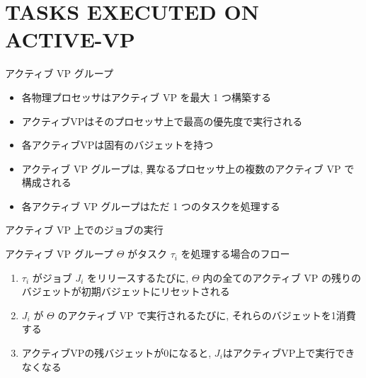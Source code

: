 
\section{TASKS EXECUTED ON ACTIVE-VP}
\label{sec: tasks executed on active-vp}

\begin{frame}{アクティブ VP グループ}
    \begin{definition}[アクティブVP]
        \begin{itemize}
            \item 各物理プロセッサはアクティブ VP を最大 1 つ構築する
            \item アクティブVPはそのプロセッサ上で最高の優先度で実行される
            \item 各アクティブVPは固有のバジェットを持つ
        \end{itemize}
    \end{definition}
    \vspace{5mm}
    \begin{itemize}
        \item アクティブ VP グループは, 異なるプロセッサ上の複数のアクティブ VP で構成される
        \item 各アクティブ VP グループはただ 1 つのタスクを処理する
        \setlength{\linewidth}{0.98\columnwidth}
    \end{itemize}
\end{frame}

\begin{frame}{アクティブ VP 上でのジョブの実行}
    \begin{block}{アクティブ VP グループ $\Theta$ がタスク $\tau_{i}$ を処理する場合のフロー}
        \setlength{\linewidth}{0.98\columnwidth}
        \begin{enumerate}
            \item $\tau_{i}$ がジョブ $J_{i}$ をリリースするたびに, $\Theta$ 内の全てのアクティブ VP の残りのバジェットが初期バジェットにリセットされる
            \item $J_{i}$ が $\Theta$ のアクティブ VP で実行されるたびに, それらのバジェットを1消費する
            \item アクティブVPの残バジェットが0になると, $J_{i}$はアクティブVP上で実行できなくなる
        \end{enumerate}
    \end{block}
\end{frame}

